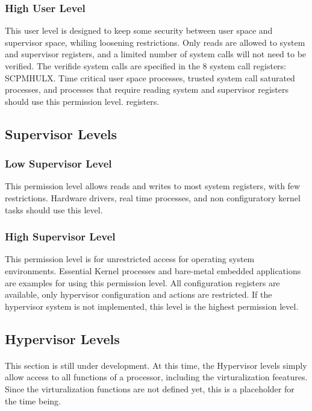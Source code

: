 \documentclass[letterpaper, 11pt]{article}
\begin{document}
\subsubsection{High User Level} This user level is designed to keep some security between user space and supervisor space, whiling loosening
restrictions. Only reads are allowed to system and supervisor registers, and a limited number of system calls will not need to be verified. 
The verifide system calls are specified in the 8 system call registers: SCPMHULX. Time critical user space processes, trusted system call 
saturated processes, and processes that require reading system and supervisor registers should use this permission level. 
registers. 

\subsection{Supervisor Levels}
\subsubsection{Low Supervisor Level} This permission level allows reads and writes to most system registers, with few restrictions. Hardware drivers,
real time processes, and non configuratory kernel tasks should use this level.
\subsubsection{High Supervisor Level} This permission level is for unrestricted access for operating system environments. Essential Kernel processes and
bare-metal embedded applications are examples for using this permission level. All configuration registers are available, only hypervisor configuration and
actions are restricted. If the hypervisor system is not implemented, this level is the highest permission level.

\subsection{Hypervisor Levels}
\paragraph{} This section is still under development. At this time, the Hypervisor levels simply allow access to all functions of a processor, including the
virturalization feeatures. Since the virturalization functions are not defined yet, this is a placeholder for the time being.
\end{document}

